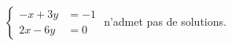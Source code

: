 $\begin{cases}-x+3y &= -1 \\ 2x-6y &= 0\end{cases}$ n'admet pas de solutions.

\begin{reponses}
\end{reponses}

